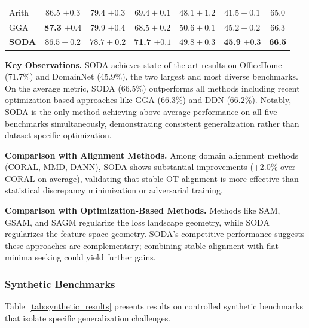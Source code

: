 \begin{table}[t]
\begin{tabular}{lcccccc}
Arith \citep{Wang2025BalancedDF} & 86.5 $\pm 0.3$ & 79.4 $\pm 0.3$ & $69.4 \pm 0.1$ & $48.1 \pm 1.2$ & $41.5 \pm 0.1$ & 65.0 \\
GGA \citep{gga2025} & \textbf{87.3} $\pm 0.4$ & 79.9 $\pm 0.4$ & $68.5 \pm 0.2$ & $50.6 \pm 0.1$ & $45.2 \pm 0.2$ & 66.3 \\
\midrule
\textbf{SODA} & $86.5 \pm 0.2$ & $78.7 \pm 0.2$ & \textbf{71.7} $\pm 0.1$ & $49.8 \pm 0.3$ & \textbf{45.9} $\pm 0.3$ & \textbf{66.5} \\
\bottomrule
\end{tabular}
\endgroup %
\end{table}

\textbf{Key Observations.} SODA achieves state-of-the-art results on OfficeHome (71.7\%) and DomainNet (45.9\%), the two largest and most diverse benchmarks. On the average metric, SODA (66.5\%) outperforms all methods including recent optimization-based approaches like GGA (66.3\%) and DDN (66.2\%). Notably, SODA is the only method achieving above-average performance on all five benchmarks simultaneously, demonstrating consistent generalization rather than dataset-specific optimization.

\textbf{Comparison with Alignment Methods.} Among domain alignment methods (CORAL, MMD, DANN), SODA shows substantial improvements (+2.0\% over CORAL on average), validating that stable OT alignment is more effective than statistical discrepancy minimization or adversarial training.

\textbf{Comparison with Optimization-Based Methods.} Methods like SAM, GSAM, and SAGM regularize the loss landscape geometry, while SODA regularizes the feature space geometry. SODA's competitive performance suggests these approaches are complementary; combining stable alignment with flat minima seeking could yield further gains.

\subsubsection{Synthetic Benchmarks}

Table~\ref{tab:synthetic_results} presents results on controlled synthetic benchmarks that isolate specific generalization challenges.

